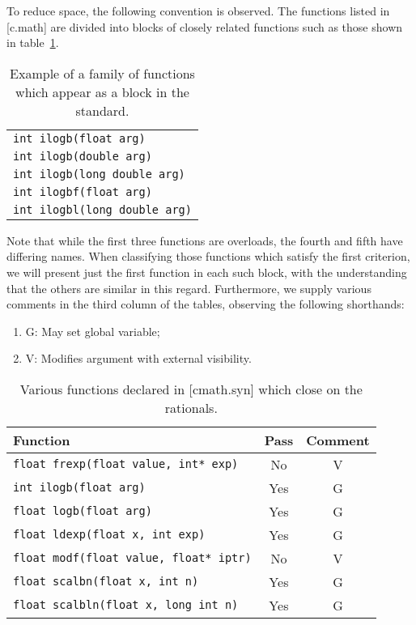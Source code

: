 \documentclass[prd,twocolumn,amsmath,amssymb,nofootinbib,eqsecnum]{revtex4-1}
\newcommand{\code}[1]{{\tt #1}}
\begin{document}
To reduce space, the following convention is observed. The
functions listed in [c.math] are divided into blocks of closely related
functions such as those shown in table~\ref{tab:example}. 
\begin{table}
	\begin{tabular}{l}
		\code{int ilogb(float arg)}
	\\
		\code{int ilogb(double arg)}
	\\
		\code{int ilogb(long double arg)}
	\\
		\code{int ilogbf(float arg)}
	\\
		\code{int ilogbl(long double arg)}
	\end{tabular}
\caption{Example of a family of functions which appear as a block in the standard.}
\label{tab:example}
\end{table}
Note that while the first three functions are overloads, the fourth and fifth
have differing names.  When classifying those functions which satisfy the first
criterion, we will present just the first function in each such block, with the
understanding that the others are similar in this regard. Furthermore, 
we supply various comments in the
third column of the tables, observing the following shorthands:
\begin{enumerate}
	\item G: May set global variable;
	
	\item V: Modifies argument with external visibility.
\end{enumerate}

\begin{table}[h]
	\begin{tabular}{lcc}
		Function & Pass & Comment
	\\
	\hline \hline
		\code{float frexp(float value, int* exp)} & No & V
	\\
	\hline
		\code{int ilogb(float arg)} & Yes & G
	\\
	\hline
		\code{float logb(float arg)} & Yes & G
	\\
	\hline
		\code{float ldexp(float x, int exp)} & Yes & G
	\\
	\hline
		\code{float modf(float value, float* iptr)} & No & V
	\\
	\hline
		\code {float scalbn(float x, int n)} & Yes & G
	\\
	\hline
		\code {float scalbln(float x, long int n)} & Yes & G
	\end{tabular}
\caption{Various functions declared in [cmath.syn] which close on the rationals.}
\label{tab:26.9.1}
\end{table}
\end{document}
